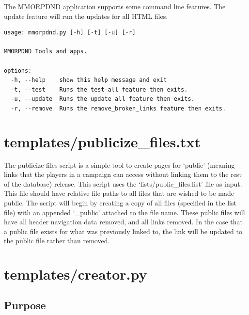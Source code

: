 The MMORPDND application supports some command line features. The update feature will run the updates for all HTML files.

\begin{lstlisting}
usage: mmorpdnd.py [-h] [-t] [-u] [-r]

MMORPDND Tools and apps.

options:
  -h, --help    show this help message and exit
  -t, --test    Runs the test-all feature then exits.
  -u, --update  Runs the update_all feature then exits.
  -r, --remove  Runs the remove_broken_links feature then exits.
\end{lstlisting}







\section{templates/publicize\_files.txt}

The publicize files script is a simple tool to create pages for `public' (meaning links that the players in a campaign can access without linking them to the rest of the database) release. This script uses the `lists/public\_files.list' file as input. This file should have relative file paths to all files that are wished to be made public. The script will begin by creating a copy of all files (specified in the list file) with an appended `\_public' attached to the file name. These public files will have all header navigation data removed, and all links removed. In the case that a public file exists for what was previously linked to, the link will be updated to the public file rather than removed.



















\section{templates/creator.py}



\subsection{Purpose}

